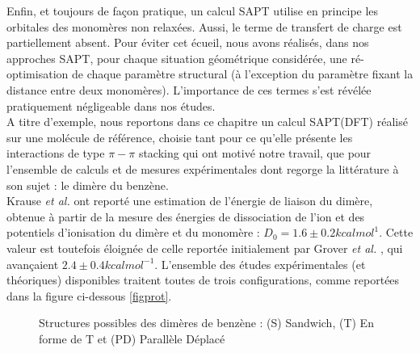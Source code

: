 \documentclass[12pt,a4paper]{book}
\begin{document}
	
	Enfin, et toujours de façon pratique, un calcul SAPT utilise en principe les orbitales des monomères non relaxées. Aussi, le terme de transfert de charge est partiellement absent. Pour éviter cet écueil, nous avons réalisés, dans nos approches SAPT, pour chaque situation géométrique considérée, une ré-optimisation de chaque paramètre structural (à l'exception du paramètre fixant la distance entre deux monomères). L’importance de ces termes s’est révélée pratiquement négligeable dans nos études.\\
	
	A titre d’exemple, nous reportons dans ce chapitre un calcul SAPT(DFT) réalisé sur une molécule de référence, choisie tant pour ce qu'elle présente les interactions de type $\pi-\pi$ stacking qui ont motivé notre travail, que pour l'ensemble de calculs et de mesures expérimentales dont regorge la littérature à son sujet : le dimère du benzène. \\
	
	Krause \textit{et al.} \cite{krause1991binding} ont reporté une estimation de l’énergie de liaison du dimère, obtenue à partir de la mesure des énergies de dissociation de l'ion et des potentiels d’ionisation du dimère et du monomère : $D_{0}= 1.6 \pm 0.2 kcal mol^{1}$. Cette valeur est toutefois éloignée de celle reportée initialement par Grover \textit{et al.} \cite{grover1987dissociation}, qui avançaient $2.4 \pm 0.4 kcal mol^{-1}$. 
	L’ensemble des études expérimentales (et théoriques) disponibles traitent toutes de trois configurations, comme reportées dans la figure ci-dessous \ref{figprot}.
	
	\begin{figure}[H]
		\centering
		\caption[Structures du dimère de Benzène]{Structures possibles des dimères de benzène : (S) Sandwich, (T) En forme de T et (PD) Parallèle Déplacé}
	\end{figure}
	
\end{document}
